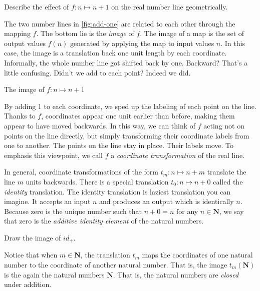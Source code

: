 \begin{question}
  Describe the effect of $f: n \mapsto n + 1$ on the real number line geometrically.
\end{question}

The two number lines in \ref{fig:add-one} are related to each other through the mapping $f$. The bottom lie is the \emph{image} of $f$. The image of a map is the set of output values $f(n)$ generated by applying the map to input values $n$. In this case, the image is a translation back one unit length by each coordinate. Informally, the whole number line got shifted back by one. Backward? That's a little confusing. Didn't we add to each point? Indeed we did.

\begin{marginfigure}
  
  \caption{\label{fig:add-one} The image of $f: n \mapsto n + 1$}
\end{marginfigure}

By adding 1 to each coordinate, we sped up the labeling of each point on the line. Thanks to $f$, coordinates appear one unit earlier than before, making them appear to have moved backwards. In this way, we can think of $f$ acting not on points on the line directly, but simply transforming their coordinate labels from one to another. The points on the line stay in place. Their labels move. To emphasis this viewpoint, we call $f$ a \emph{coordinate transformation} of the real line.

In general, coordinate transformations of the form $t_m: n \mapsto n + m$ translate the line $m$ units backwards. There is a special translation $t_0: n \mapsto n + 0$ called the \emph{identity} translation. The identity translation is laziest translation you can imagine. It accepts an input $n$ and produces an output which is identically $n$. Because zero is the unique number such that $n + 0 = n$ for any $n \in \mathbf{N}$, we say that zero is the \emph{additive identity element} of the natural numbers.

\begin{question}
  Draw the image of $id_+$.
\end{question}

Notice that when $m \in \mathbf{N}$, the translation $t_m$ maps the coordinates of one natural number to the coordinate of another natural number. That is, the image $t_m(\mathbf{N})$ is the again the natural numbers $\mathbf{N}$. That is, the natural numbers are \emph{closed} under addition.

